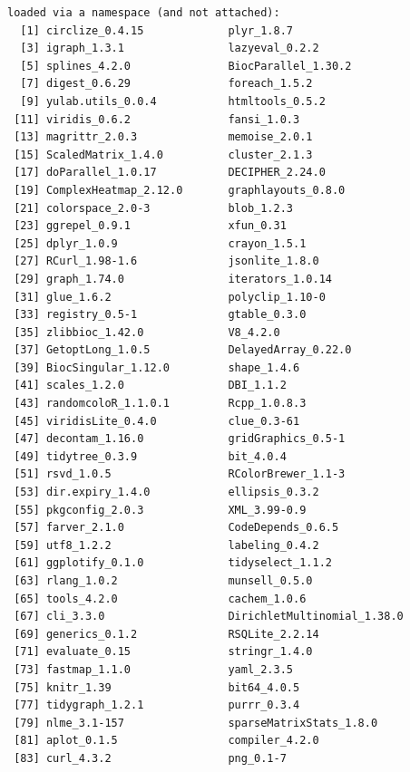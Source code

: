 \documentclass[
]{book}
\begin{document}
\begin{verbatim}
loaded via a namespace (and not attached):
  [1] circlize_0.4.15             plyr_1.8.7                 
  [3] igraph_1.3.1                lazyeval_0.2.2             
  [5] splines_4.2.0               BiocParallel_1.30.2        
  [7] digest_0.6.29               foreach_1.5.2              
  [9] yulab.utils_0.0.4           htmltools_0.5.2            
 [11] viridis_0.6.2               fansi_1.0.3                
 [13] magrittr_2.0.3              memoise_2.0.1              
 [15] ScaledMatrix_1.4.0          cluster_2.1.3              
 [17] doParallel_1.0.17           DECIPHER_2.24.0            
 [19] ComplexHeatmap_2.12.0       graphlayouts_0.8.0         
 [21] colorspace_2.0-3            blob_1.2.3                 
 [23] ggrepel_0.9.1               xfun_0.31                  
 [25] dplyr_1.0.9                 crayon_1.5.1               
 [27] RCurl_1.98-1.6              jsonlite_1.8.0             
 [29] graph_1.74.0                iterators_1.0.14           
 [31] glue_1.6.2                  polyclip_1.10-0            
 [33] registry_0.5-1              gtable_0.3.0               
 [35] zlibbioc_1.42.0             V8_4.2.0                   
 [37] GetoptLong_1.0.5            DelayedArray_0.22.0        
 [39] BiocSingular_1.12.0         shape_1.4.6                
 [41] scales_1.2.0                DBI_1.1.2                  
 [43] randomcoloR_1.1.0.1         Rcpp_1.0.8.3               
 [45] viridisLite_0.4.0           clue_0.3-61                
 [47] decontam_1.16.0             gridGraphics_0.5-1         
 [49] tidytree_0.3.9              bit_4.0.4                  
 [51] rsvd_1.0.5                  RColorBrewer_1.1-3         
 [53] dir.expiry_1.4.0            ellipsis_0.3.2             
 [55] pkgconfig_2.0.3             XML_3.99-0.9               
 [57] farver_2.1.0                CodeDepends_0.6.5          
 [59] utf8_1.2.2                  labeling_0.4.2             
 [61] ggplotify_0.1.0             tidyselect_1.1.2           
 [63] rlang_1.0.2                 munsell_0.5.0              
 [65] tools_4.2.0                 cachem_1.0.6               
 [67] cli_3.3.0                   DirichletMultinomial_1.38.0
 [69] generics_0.1.2              RSQLite_2.2.14             
 [71] evaluate_0.15               stringr_1.4.0              
 [73] fastmap_1.1.0               yaml_2.3.5                 
 [75] knitr_1.39                  bit64_4.0.5                
 [77] tidygraph_1.2.1             purrr_0.3.4                
 [79] nlme_3.1-157                sparseMatrixStats_1.8.0    
 [81] aplot_0.1.5                 compiler_4.2.0             
 [83] curl_4.3.2                  png_0.1-7                  

\end{verbatim}
\end{document}
